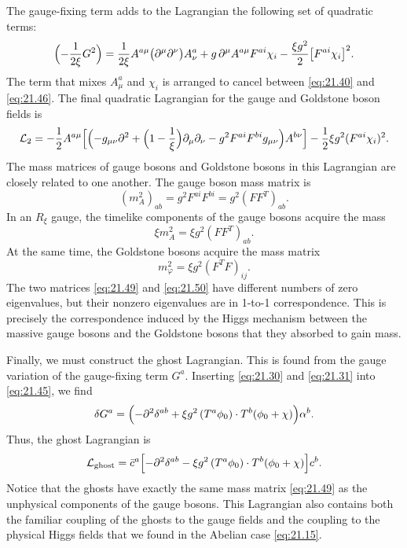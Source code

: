The gauge-fixing term adds to the Lagrangian the following set of quadratic
terms:
\begin{equation}
  \Bigl( -\frac{1}{2\xi}G^2 \Bigr) = \frac{1}{2\xi}A^{a\mu}\bigl(
    \partial^\mu\partial^\nu \bigr)A^a_\nu + g\,\partial^\mu A^{a\mu}F^{ai}\chi_i
    - \frac{\xi g^2}{2}\bigl[ F^{ai}\chi_i \bigr]^2 .
  \label{eq:21.46}
\end{equation}
The term that mixes $A^a_\mu$ and $\chi_i$ is arranged to cancel between
\eqref{eq:21.40} and \eqref{eq:21.46}.  The final quadratic Lagrangian for
the gauge and Goldstone boson fields is
\begin{equation}
  \mathcal{L}_2 = -\frac{1}{2}A^{a\mu}\Bigl[ \Bigl( -g_{\mu\nu}\partial^2
    + \Bigl( 1 - \frac{1}{\xi} \Bigr)\partial_\mu\partial_\nu
    - g^2F^{ai}F^{bi}g_{\mu\nu} \Bigr)A^{b\nu} \Bigr]
    - \frac{1}{2}\xi g^2(F^{ai}\chi_i)^2 .
  \label{eq:21.47}
\end{equation}
The mass matrices of gauge bosons and Goldstone bosons in this Lagrangian are
closely related to one another.  The gauge boson mass matrix is
\begin{equation}
  (m^2_A)_{ab} = g^2F^{ai}F^{bi} = g^2(FF^T)_{ab} .
  \label{eq:21.48}
\end{equation}
In an $R_\xi$ gauge, the timelike components of the gauge bosons acquire the
mass
\begin{equation}
  \xi m^2_A = \xi g^2(FF^T)_{ab} .
  \label{eq:21.49}
\end{equation}
At the same time, the Goldstone bosons acquire the mass matrix
\begin{equation}
  m^2_\varphi = \xi g^2(F^TF)_{ij} .
  \label{eq:21.50}
\end{equation}
The two matrices \eqref{eq:21.49} and \eqref{eq:21.50} have different numbers
of zero eigenvalues, but their nonzero eigenvalues are in 1-to-1
correspondence.  This is precisely the correspondence induced by the Higgs
mechanism between the massive gauge bosons and the Goldstone bosons that they
absorbed to gain mass.

Finally, we must construct the ghost Lagrangian.  This is found from the
gauge variation of the gauge-fixing term $G^a$.  Inserting \eqref{eq:21.30}
and \eqref{eq:21.31} into \eqref{eq:21.45}, we find
\begin{equation}
  \delta G^a = \Bigl( -\partial^2\delta^{ab} + \xi g^2\,(T^a\phi_0)\cdot
    T^b(\phi_0 + \chi) \Bigr)\alpha^b .
  \label{eq:21.51}
\end{equation}
Thus, the ghost Lagrangian is
\begin{equation}
  \mathcal{L}_{\mathrm{ghost}} = \bar{c}^a\Bigl[ -\partial^2\delta^{ab}
    - \xi g^2\,(T^a\phi_0)\cdot T^b(\phi_0 + \chi) \Bigr]c^b .
  \label{eq:21.52}
\end{equation}
Notice that the ghosts have exactly the same mass matrix \eqref{eq:21.49} as
the unphysical components of the gauge bosons.  This Lagrangian also contains
both the familiar coupling of the ghosts to the gauge fields and the coupling
to the physical Higgs fields that we found in the Abelian case \eqref{eq:21.15}.

